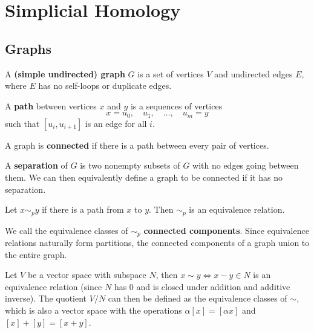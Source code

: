 \documentclass[twoside,10pt]{report}
\begin{document}
\tableofcontents


\chapter{Simplicial Homology}

\section{Graphs}

\begin{defn}[]
	A \textbf{(simple undirected) graph} $G$ is a set of vertices $V$ and undirected edges $E$, where $E$ has no self-loops or duplicate edges.
\end{defn}

\begin{defn}[]
	A \textbf{path} between vertices $x$ and $y$ is a sequences of vertices
	\[
	x=u_0, \quad u_1, \quad \dots, \quad u_m=y
\] such that $[u_i,u_{i+1}]$ is an edge for all $i$.
\end{defn}

\begin{defn}[]
A graph is \textbf{connected} if there is a path between every pair of vertices.
\end{defn}

A \textbf{separation} of $G$ is two nonempty subsets of $G$ with no edges going between them. We can then equivalently define a graph to be connected if it has no separation.

\begin{prop}
Let $x \sim_{p} y$ if there is a path from $x$ to $y$. Then $\sim_{p}$ is an equivalence relation.
\end{prop}

We call the equivalence classes of $\sim_{p}$ \textbf{connected components}. Since equivalence relations naturally form partitions, the connected components of a graph union to the entire graph.

\begin{ex}[]
	Let $V$ be a vector space with subspace $N$, then $x \sim y \iff x - y \in N$ is an equivalence relation (since $N$ has 0 and is closed under addition and additive inverse). The quotient $V/N$ can then be defined as the equivalence classes of $\sim$, which is also a vector space with the operations $\alpha[x] = [\alpha x]$ and $[x]+[y] = [x+y]$.
\end{ex}
\end{document}
